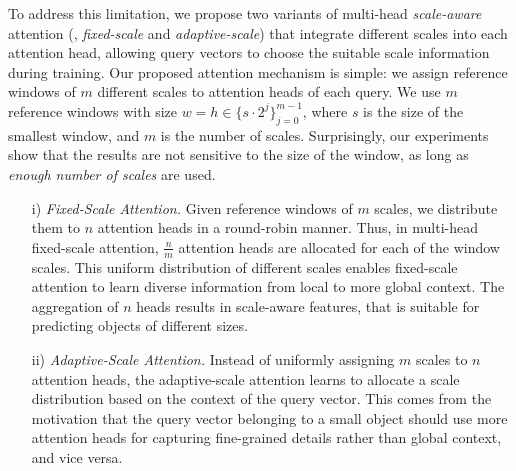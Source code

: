 To address this limitation, we propose two variants of multi-head \emph{scale-aware} attention (\ie, \emph{fixed-scale} and \emph{adaptive-scale}) that integrate different scales into each attention head, allowing query vectors to choose the suitable scale information during training. Our proposed attention mechanism is simple: we assign reference windows of $m$ different scales to attention heads of each query. We use $m$ reference windows with size $w {=} h \in \{s \cdot 2^j\}_{j=0}^{m-1}$, where $s$ is the size of the smallest window, and $m$ is the number of scales. Surprisingly, our experiments show that the results are not sensitive to the size of the window, as long as \emph{enough number of scales} are used.
%
\begin{enumerate}[leftmargin=*,itemsep=0pt,topsep=0pt]
    \item[i)] \emph{Fixed-Scale Attention.} Given reference windows of $m$ scales, we distribute them to $n$ attention heads in a round-robin manner. Thus, in multi-head fixed-scale attention, $\frac{n}{m}$ attention heads are allocated for each of the window scales. This uniform distribution of different scales enables fixed-scale attention to learn diverse information from local to more global context. The aggregation of $n$ heads results in scale-aware features, that is suitable for predicting objects of different sizes.
    \item[ii)] \emph{Adaptive-Scale Attention.} Instead of uniformly assigning $m$ scales to $n$ attention heads, the adaptive-scale attention learns to allocate a scale distribution based on the context of the query vector. This comes from the motivation that the query vector belonging to a small object should use more attention heads for capturing fine-grained details rather than global context, and vice versa. 
    

\end{enumerate}
